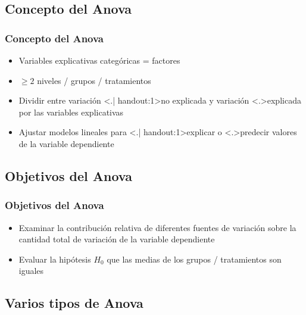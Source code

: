 \documentclass[gray,handout,mathserif]{beamer}
\begin{document}
\subsection[Concepto]{Concepto del Anova}
 
\begin{frame}[label=anov6]
   \frametitle{Concepto del Anova}
    \begin{itemize}[<+-| handout:1>]
      \item Variables explicativas categ\'oricas = \alert{factores}
      \item $\geq 2$ \alert{niveles} / grupos / tratamientos
      \item Dividir entre variaci\'on \structure<.| handout:1>{no explicada} y variaci\'on \structure<.>{explicada} por las variables explicativas
      \item Ajustar modelos lineales para \structure<.| handout:1>{explicar} o \structure<.>{predecir} valores de la variable dependiente
   \end{itemize}
\end{frame}%


\subsection[Objetivos]{Objetivos del Anova}

\begin{frame}[label=anov7]
   \frametitle{Objetivos del Anova}
    \begin{itemize}[<+-| handout:1>]
      \item Examinar la contribuci\'on relativa de diferentes fuentes de variaci\'on sobre la cantidad total de variaci\'on de la variable dependiente
      \item Evaluar la hip\'otesis $H_0$ que las medias de los grupos / tratamientos son iguales
   \end{itemize}
\end{frame}%


\subsection[Varios tipos]{Varios tipos de Anova}
 
\end{document}
